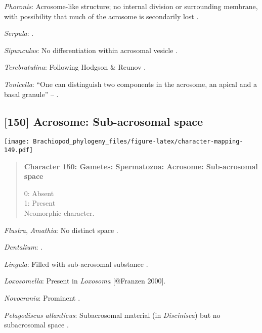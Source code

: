 \documentclass[openany]{book}
\theoremstyle{definition}
\theoremstyle{definition}
\theoremstyle{definition}
\theoremstyle{remark}
\begin{document}
\hypertarget{Phoronis-coding-149}{}
\emph{Phoronis}: Acrosome-like structure; no internal division or
surrounding membrane, with possibility that much of the acrosome is
secondarily lost \citep{Reunov2004Ultrastructuralstudy}.

\hypertarget{Serpula-coding-149}{}
\emph{Serpula}: \citet{Gherardi2011}.

\hypertarget{Sipunculus-coding-149}{}
\emph{Sipunculus}: No differentiation within acrosomal vesicle
\citep{Rice1993}.

\hypertarget{Terebratulina-coding-149}{}
\emph{Terebratulina}: Following Hodgson \& Reunov
\citeyearpar{Hodgson1994Ultrastructureof}.

\hypertarget{Tonicella-coding-149}{}
\emph{Tonicella}: ``One can distinguish two components in the acrosome,
an apical and a basal granule'' -- \citet{BucklandNicks1988}.

\subsection*{{[}150{]} Acrosome: Sub-acrosomal
space}\label{acrosome-sub-acrosomal-space}

\texttt{[image: Brachiopod\_phylogeny\_files/figure-latex/character-mapping-149.pdf]}

\begin{quote}
\textbf{Character 150: Gametes: Spermatozoa: Acrosome: Sub-acrosomal
space}

0: Absent\\
1: Present\\
Neomorphic character.
\end{quote}

\hypertarget{Amathia-coding-150}{}
\emph{Flustra}, \emph{Amathia}: No distinct space \citep[in
\emph{Tubulipora};][]{Franzen1984}.

\hypertarget{Dentalium-coding-150}{}
\emph{Dentalium}: \citet{DufresneDube1983}.

\hypertarget{Lingula-coding-150}{}
\emph{Lingula}: Filled with sub-acrosomal substance
\citep{Fukumoto2003Theacrosome}.

\hypertarget{Loxosomella-coding-150}{}
\emph{Loxosomella}: Present in \emph{Loxosoma} {[}@Franzen 2000{]}.

\hypertarget{Novocrania-coding-150}{}
\emph{Novocrania}: Prominent \citep{Afzelius1978Finestructure}.

\hypertarget{Pelagodiscus_atlanticus-coding-150}{}
\emph{Pelagodiscus atlanticus}: Subacrosomal material (in
\emph{Discinisca}) but no subacrosomal space
\citep{Hodgson1994Ultrastructureof}.
\end{document}
